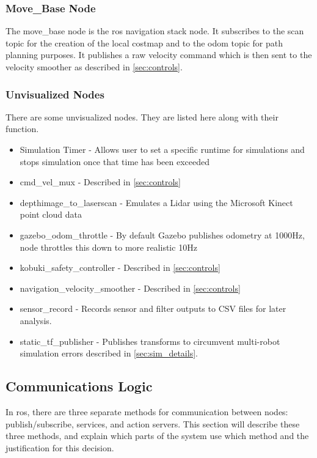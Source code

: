 \documentclass[thesis.tex]{subfile}
\begin{document}
\subsubsection{Move\_Base Node}
The move\_base node is the \gls{ros} navigation stack node. It subscribes to the scan topic for the creation of the local costmap and to the odom topic for path planning purposes. It publishes a raw velocity command which is then sent to the velocity smoother as described in \cref{sec:controls}.

\subsubsection{Unvisualized Nodes}
There are some unvisualized nodes. They are listed here along with their function.
\begin{itemize}
\item Simulation Timer - Allows user to set a specific runtime for simulations and stops simulation once that time has been exceeded
\item cmd\_vel\_mux - Described in \cref{sec:controls}
\item depthimage\_to\_laserscan - Emulates a Lidar using the Microsoft Kinect point cloud data~\cite{Rockey2016}
\item gazebo\_odom\_throttle - By default Gazebo publishes odometry at 1000Hz, node throttles this down to more realistic 10Hz
\item kobuki\_safety\_controller - Described in \cref{sec:controls}
\item navigation\_velocity\_smoother - Described in \cref{sec:controls}
\item sensor\_record - Records sensor and filter outputs to \gls{CSV} files for later analysis.
\item static\_tf\_publisher - Publishes transforms to circumvent multi-robot simulation errors described in \cref{sec:sim_details}.
\end{itemize}

\subsection{Communications Logic}
In \gls{ros}, there are three separate methods for communication between nodes: publish/subscribe, services, and action servers. This section will describe these three methods, and explain which parts of the system use which method and the justification for this decision.
\end{document}
